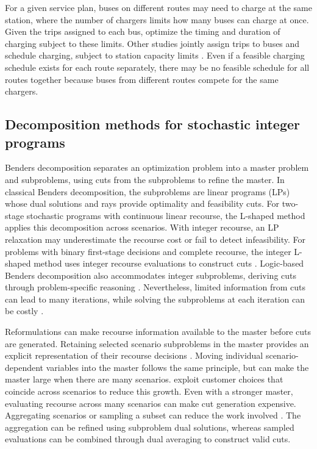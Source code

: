 For a given service plan, buses on different routes may need to charge at the same station, where the number of chargers limits how many buses can charge at once.
Given the trips assigned to each bus, \citet{abdelwahed_opportunity_2020} optimize the timing and duration of charging subject to these limits.
Other studies jointly assign trips to buses and schedule charging, subject to station capacity limits \citep{gkiotsalitis_multi_depot_2023,devos_capacitated_2024,ricard_battery_2026}.
Even if a feasible charging schedule exists for each route separately, there may be no feasible schedule for all routes together because buses from different routes compete for the same chargers.

\subsection{Decomposition methods for stochastic integer programs}
\label{subsec:lit-stochastic-decomposition}

Benders decomposition separates an optimization problem into a master problem and subproblems, using cuts from the subproblems to refine the master.
In classical Benders decomposition, the subproblems are linear programs (LPs) whose dual solutions and rays provide optimality and feasibility cuts.
For two-stage stochastic programs with continuous linear recourse, the L-shaped method applies this decomposition across scenarios.
With integer recourse, an LP relaxation may underestimate the recourse cost or fail to detect infeasibility.
For problems with binary first-stage decisions and complete recourse, the integer L-shaped method uses integer recourse evaluations to construct cuts \citep{laporte_integer_1993}.
Logic-based Benders decomposition also accommodates integer subproblems, deriving cuts through problem-specific reasoning \citep{hooker_logic_2003}.
Nevertheless, limited information from cuts can lead to many iterations, while solving the subproblems at each iteration can be costly \citep{rahmaniani_review_2017}.

Reformulations can make recourse information available to the master before cuts are generated.
Retaining selected scenario subproblems in the master provides an explicit representation of their recourse decisions \citep{crainic_partial_2021,celik_twostep_2025}.
Moving individual scenario-dependent variables into the master follows the same principle, but can make the master large when there are many scenarios.
\citet{lai_strengthened_2025} exploit customer choices that coincide across scenarios to reduce this growth.
Even with a stronger master, evaluating recourse across many scenarios can make cut generation expensive.
Aggregating scenarios or sampling a subset can reduce the work involved \citep{ramirez_adaptive_2023,bertsimas_stochastic_2025}.
The aggregation can be refined using subproblem dual solutions, whereas sampled evaluations can be combined through dual averaging to construct valid cuts.

